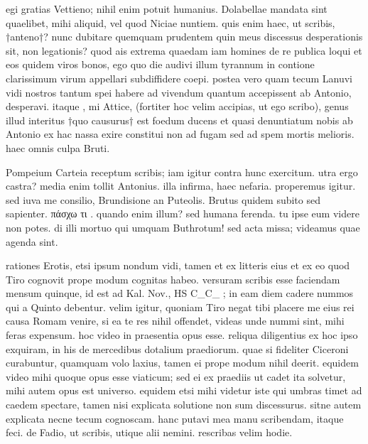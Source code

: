 


 egi gratias Vettieno; nihil enim potuit humanius. Dolabellae mandata sint quaelibet, mihi aliquid, vel quod Niciae nuntiem. quis enim haec, ut scribis, †anteno†? nunc dubitare quemquam prudentem quin meus discessus desperationis sit, non legationis? quod ais extrema quaedam iam homines de re publica loqui et eos quidem viros bonos, ego quo die audivi illum tyrannum in contione clarissimum virum appellari subdiffidere coepi. postea vero quam tecum Lanuvi vidi nostros tantum spei habere ad vivendum quantum accepissent ab Antonio, desperavi. itaque , mi Attice, (fortiter hoc velim accipias, ut ego scribo), genus illud interitus †quo causurus† est foedum ducens et quasi denuntiatum nobis ab Antonio ex hac nassa exire constitui non ad fugam sed ad spem mortis melioris. haec omnis culpa Bruti.

 Pompeium Carteia receptum scribis; iam igitur contra hunc exercitum. utra ergo castra? media enim tollit Antonius. illa infirma, haec nefaria. properemus igitur. sed iuva me consilio, Brundisione an Puteolis. Brutus quidem subito sed sapienter. πάσχω τι . quando enim illum? sed humana ferenda. tu ipse eum videre non potes. di illi mortuo qui umquam Buthrotum! sed acta missa; videamus quae agenda sint.

 rationes Erotis, etsi ipsum nondum vidi, tamen et ex litteris eius et ex eo quod Tiro cognovit prope modum cognitas habeo. versuram scribis esse faciendam mensum quinque, id est ad Kal. Nov., HS C_C_ ; in eam diem cadere nummos qui a Quinto debentur. velim igitur, quoniam Tiro negat tibi placere me eius rei causa Romam venire, si ea te res nihil offendet, videas unde nummi sint, mihi feras expensum. hoc video in praesentia opus esse. reliqua diligentius ex hoc ipso exquiram, in his de mercedibus dotalium praediorum. quae si fideliter Ciceroni curabuntur, quamquam volo laxius, tamen ei prope modum nihil deerit. equidem video mihi quoque opus esse viaticum; sed ei ex praediis ut cadet ita solvetur, mihi autem opus est universo. equidem etsi mihi videtur iste qui umbras timet ad caedem spectare, tamen nisi explicata solutione non sum discessurus. sitne autem explicata necne tecum cognoscam. hanc putavi mea manu scribendam, itaque feci. de Fadio, ut scribis, utique alii nemini. rescribas velim hodie.

